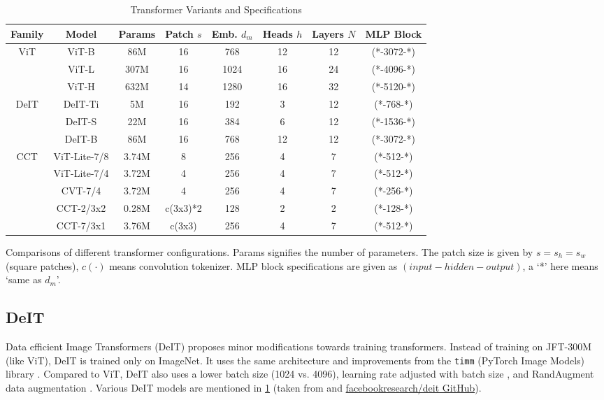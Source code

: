 \begin{table}
    \centering
    \begin{tabular}{cccccccc}
        \hline
        Family & Model & Params & Patch $s$ & Emb. $d_m$ & 
            Heads $h$ & Layers $N$ & MLP Block \\
        \hline
        \multirow{3}{*}{ViT \cite{Dosovitskiy2020AnII}} &
            ViT-B & 86M & 16 & 768 & 12 & 12 & (*-3072-*) \\
            & ViT-L & 307M & 16 & 1024 & 16 & 24 & (*-4096-*) \\
            & ViT-H & 632M & 14 & 1280 & 16 & 32 & (*-5120-*) \\
        \hline
        \multirow{3}{*}{DeIT \cite{Touvron2020TrainingDI}} &
            DeIT-Ti & 5M & 16 & 192 & 3 & 12 & (*-768-*) \\
            & DeIT-S & 22M & 16 & 384 & 6 & 12 & (*-1536-*) \\
            & DeIT-B & 86M & 16 & 768 & 12 & 12 & (*-3072-*) \\
        \hline
        \multirow{5}{*}{CCT \cite{Hassani2021EscapingTB}} &
            ViT-Lite-7/8 & 3.74M & 8 & 256 & 4 & 7 & (*-512-*) \\
            & ViT-Lite-7/4 & 3.72M & 4 & 256 & 4 & 7 & (*-512-*) \\
            & CVT-7/4 & 3.72M & 4 & 256 & 4 & 7 & (*-256-*) \\
            & CCT-2/3x2 & 0.28M & c(3x3)*2 & 128 & 2 & 2 & 
                (*-128-*) \\
            & CCT-7/3x1 & 3.76M & c(3x3) & 256 & 4 & 7 & (*-512-*) \\
        \hline
    \end{tabular}
    \caption{Transformer Variants and Specifications}
    \small
        Comparisons of different transformer configurations. Params
        signifies the number of parameters. The patch size is given by
        $s = s_h = s_w$ (square patches), $c(\cdot)$ means convolution
        tokenizer. MLP block specifications are given as
        $(input-hidden-output)$, a `*' here means `same as $d_m$'.
    \label{tab:vit_configs}
\end{table}

\subsection{DeIT}
\label{subsec:vit-deit}

Data efficient Image Transformers (DeIT) \cite{Touvron2020TrainingDI}
proposes minor modifications towards training transformers. Instead of
training on JFT-300M (like ViT), DeIT is trained only on ImageNet. It
uses the same architecture and improvements from the \texttt{timm}
(PyTorch Image Models) library \cite{Wightman2019PyTorchIM}. Compared
to ViT, DeIT also uses a lower batch size (1024 vs. 4096), learning
rate adjusted with batch size \cite{Goyal2017AccurateLM}, and
RandAugment data augmentation \cite{Cubuk2020RandaugmentPA}. Various
DeIT models are mentioned in \cref{tab:vit_configs} (taken from
\cite{Touvron2020TrainingDI} and
\href{https://github.com/facebookresearch/deit/blob/263a3fcafc2bf17885a4af62e6030552f346dc71/models.py}{facebookresearch/deit
GitHub}).

